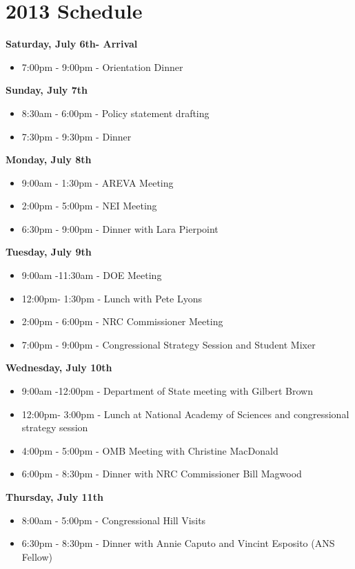 \documentclass[12pt]{article}
\begin{document}
\newpage
\section{2013 Schedule}

\textbf{Saturday, July 6th- Arrival}
\begin{itemize}
\item 7:00pm - 9:00pm - Orientation Dinner
\end{itemize}

\textbf{Sunday, July 7th}
\begin{itemize}
\item 8:30am - 6:00pm - Policy statement drafting
\item 7:30pm - 9:30pm - Dinner
\end{itemize}

\textbf{Monday, July 8th}
\begin{itemize}
\item 9:00am - 1:30pm - AREVA Meeting
\item 2:00pm - 5:00pm - NEI Meeting
\item 6:30pm - 9:00pm - Dinner with Lara Pierpoint
\end{itemize}

\textbf{Tuesday, July 9th}
\begin{itemize}
\item 9:00am -11:30am - DOE Meeting
\item 12:00pm- 1:30pm - Lunch with Pete Lyons
\item 2:00pm - 6:00pm - NRC Commissioner Meeting
\item 7:00pm - 9:00pm - Congressional Strategy Session and Student Mixer
\end{itemize}

\textbf{Wednesday, July 10th}
\begin{itemize}
\item 9:00am -12:00pm - Department of State meeting with Gilbert Brown
\item 12:00pm- 3:00pm - Lunch at National Academy of Sciences and congressional
  strategy session
\item 4:00pm - 5:00pm - OMB Meeting with Christine MacDonald
\item 6:00pm - 8:30pm - Dinner with NRC Commissioner Bill Magwood
\end{itemize}

\textbf{Thursday, July 11th}
\begin{itemize}
\item 8:00am - 5:00pm - Congressional Hill Visits
\item 6:30pm - 8:30pm - Dinner with Annie Caputo and Vincint Esposito (ANS
  Fellow)
\end{itemize}
\end{document}
